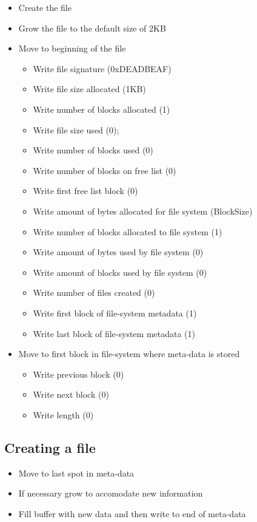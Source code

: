 \documentclass{article}
\begin{document}
\begin{itemize}
    \item   Create the file
    \item   Grow the file to the default size of 2KB
        \item    Move to beginning of the file
        \begin{itemize}
            \item   Write file signature (0xDEADBEAF)
            \item   Write file size allocated (1KB)
            \item   Write number of blocks allocated (1)
            \item   Write file size used (0);
            \item   Write number of blocks used (0)
            \item   Write number of blocks on free list (0)
            \item   Write first free list block (0)
            \item   Write amount of bytes allocated for file system (BlockSize) 
            \item   Write number of blocks allocated to file system (1)
            \item   Write amount of bytes used by file system (0)
            \item   Write amount of blocks used by file system (0)
            \item   Write number of files created (0)
            \item   Write first block of file-system metadata (1) 
            \item   Write last block of file-system metadata (1) 
        \end{itemize}
    \item   Move to first block in file-system where meta-data is stored
        \begin{itemize}
            \item   Write previous block (0)
            \item   Write next block (0)
            \item   Write length (0)
        \end{itemize}
\end{itemize}

\subsection*{Creating a file}

\begin{itemize}
    \item    Move to last spot in meta-data
    \item    If necessary grow to accomodate new information
    \item    Fill buffer with new data and then write to end of meta-data
\end{itemize}
\end{document}
